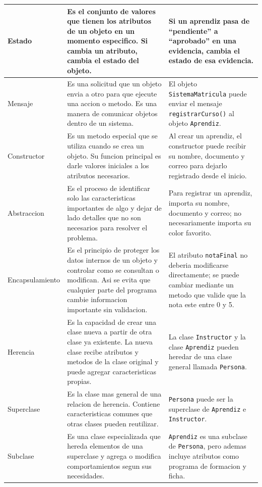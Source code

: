 \documentclass[12pt,letterpaper]{article}
\begin{document}
\begin{longtable}{|p{3cm}|p{7cm}|p{4cm}|}
\hline
Estado & Es el conjunto de valores que tienen los atributos de un objeto en un momento especifico. Si cambia un atributo, cambia el estado del objeto. & Si un aprendiz pasa de ``pendiente'' a ``aprobado'' en una evidencia, cambia el estado de esa evidencia. \\
\hline
Mensaje & Es una solicitud que un objeto envia a otro para que ejecute una accion o metodo. Es una manera de comunicar objetos dentro de un sistema. & El objeto \texttt{SistemaMatricula} puede enviar el mensaje \texttt{registrarCurso()} al objeto \texttt{Aprendiz}. \\
\hline
Constructor & Es un metodo especial que se utiliza cuando se crea un objeto. Su funcion principal es darle valores iniciales a los atributos necesarios. & Al crear un aprendiz, el constructor puede recibir su nombre, documento y correo para dejarlo registrado desde el inicio. \\
\hline
Abstraccion & Es el proceso de identificar solo las caracteristicas importantes de algo y dejar de lado detalles que no son necesarios para resolver el problema. & Para registrar un aprendiz, importa su nombre, documento y correo; no necesariamente importa su color favorito. \\
\hline
Encapsulamiento & Es el principio de proteger los datos internos de un objeto y controlar como se consultan o modifican. Asi se evita que cualquier parte del programa cambie informacion importante sin validacion. & El atributo \texttt{notaFinal} no deberia modificarse directamente; se puede cambiar mediante un metodo que valide que la nota este entre 0 y 5. \\
\hline
Herencia & Es la capacidad de crear una clase nueva a partir de otra clase ya existente. La nueva clase recibe atributos y metodos de la clase original y puede agregar caracteristicas propias. & La clase \texttt{Instructor} y la clase \texttt{Aprendiz} pueden heredar de una clase general llamada \texttt{Persona}. \\
\hline
Superclase & Es la clase mas general de una relacion de herencia. Contiene caracteristicas comunes que otras clases pueden reutilizar. & \texttt{Persona} puede ser la superclase de \texttt{Aprendiz} e \texttt{Instructor}. \\
\hline
Subclase & Es una clase especializada que hereda elementos de una superclase y agrega o modifica comportamientos segun sus necesidades. & \texttt{Aprendiz} es una subclase de \texttt{Persona}, pero ademas incluye atributos como programa de formacion y ficha. \\

\end{longtable}
\end{document}
